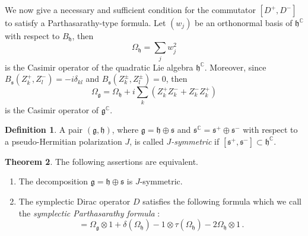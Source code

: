 \documentclass{amsart}[draft,11pt]
\newcommand{\mg}{\mathfrak{g}}
\newcommand{\mh}{\mathfrak{h}}
\newcommand{\ms}{\mathfrak{s}}
\numberwithin{equation}{section}
\theoremstyle{definition}
\newtheorem{theorem}{Theorem}[section]
\newtheorem{definition}[theorem]{Definition}
\begin{document}
We now give a necessary and sufficient condition for the commutator $[D^+,D^-]$ to satisfy a Parthasarathy-type formula. Let $(w_j)$ be an orthonormal 
basis of $\mh^\mathbb{C}$ with respect to $B_\mh$, then  
$$\Omega_{\mh}= \sum_j w_j^2$$  
is the  Casimir operator of the quadratic Lie algebra $\mh^\mathbb{C}$. Moreover, since $B_\ms(Z_k^+,Z_l^-)=-i\delta_{kl}$ and $B_\ms(Z_k^\pm,Z_l^\pm)= 0 $, then
$$
\Omega_\mg = \Omega_{\mh} + i\sum_k (Z_k^+Z_k^- + Z_k^-Z_k^+)
$$
is the Casimir operator of $\mg^\mathbb{C}$.

\begin{definition}
A pair $(\mg,\mh)$, where $\mg=\mh \oplus \ms$ and
$\ms^{\mathbb C}=\ms^+\oplus \ms^-$ with respect to a pseudo-Hermitian polarization $J$, is called
\emph{$J$-symmetric}
if $[\ms^+,\ms^-]\subset \mh^\mathbb{C}$.
\end{definition}

\begin{theorem}
\label{Dirac-Parthasarthy}
The following assertions are equivalent.
\begin{enumerate}
\item The decomposition $\mg= \mh \oplus \ms$ 
is $J$-symmetric.
\item The symplectic Dirac operator $D$ satisfies 
the following formula
which we call the \emph{symplectic Parthasarathy formula} :
\begin{equation}
[D^+,D^-]= \Omega_{\mg}\otimes 1 + \delta(\Omega_{\mh})-1\otimes \tau(\Omega_{\mh})- 2\Omega_\mh \otimes 1 \,.
\label{partha}
\end{equation}
\end{enumerate}

\end{theorem}
\end{document}
